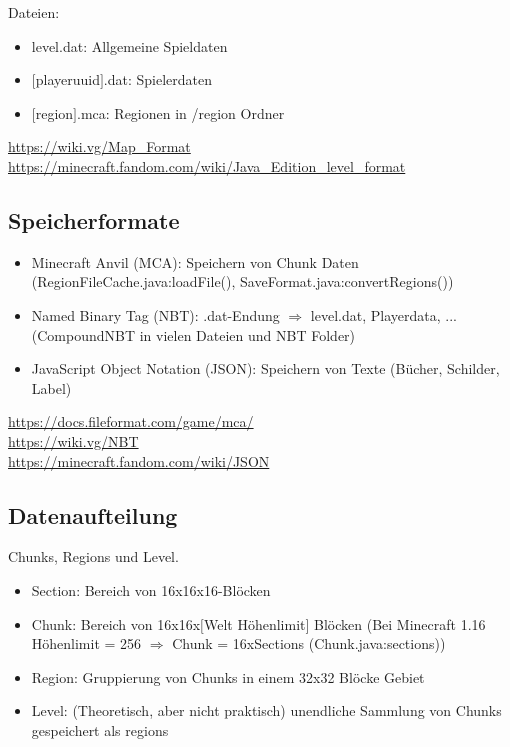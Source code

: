 Dateien:
\begin{itemize}
    \item level.dat: Allgemeine Spieldaten
    \item $[$playeruuid$]$.dat: Spielerdaten
    \item $[$region$]$.mca: Regionen in /region Ordner
\end{itemize}

\url{https://wiki.vg/Map_Format}\\
\url{https://minecraft.fandom.com/wiki/Java_Edition_level_format}

\subsection{Speicherformate}
\begin{itemize}
    \item Minecraft Anvil (MCA): Speichern von Chunk Daten (RegionFileCache.java:loadFile(), SaveFormat.java:convertRegions())
    \item Named Binary Tag (NBT): .dat-Endung $\Rightarrow$ level.dat, Playerdata, ... (CompoundNBT in vielen Dateien und NBT Folder)
    \item JavaScript Object Notation (JSON): Speichern von Texte (Bücher, Schilder, Label)
\end{itemize}

\url{https://docs.fileformat.com/game/mca/}\\
\url{https://wiki.vg/NBT}\\
\url{https://minecraft.fandom.com/wiki/JSON}

\subsection{Datenaufteilung}
Chunks, Regions und Level. 

\begin{itemize}
    \item Section: Bereich von 16x16x16-Blöcken
    \item Chunk: Bereich von 16x16x$[$Welt Höhenlimit$]$ Blöcken (Bei Minecraft 1.16 Höhenlimit = 256 $\Rightarrow{}$ Chunk = 16xSections (Chunk.java:sections))
    \item Region: Gruppierung von Chunks in einem 32x32 Blöcke Gebiet
    \item Level: (Theoretisch, aber nicht praktisch) unendliche Sammlung von Chunks gespeichert als regions
\end{itemize}

